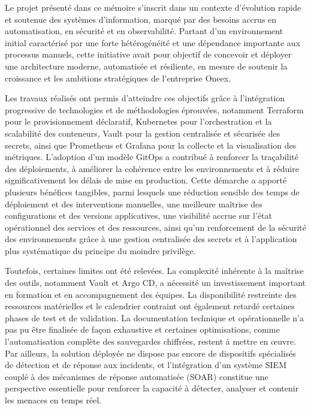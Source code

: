 \thispagestyle{mainmatter}

Le projet présenté dans ce mémoire s’inscrit dans un contexte d’évolution rapide et soutenue des systèmes d’information, marqué par des besoins accrus en automatisation, en sécurité et en observabilité. Partant d’un environnement initial caractérisé par une forte hétérogénéité et une dépendance importante aux processus manuels, cette initiative avait pour objectif de concevoir et déployer une architecture moderne, automatisée et résiliente, en mesure de soutenir la croissance et les ambitions stratégiques de l’entreprise Oneex.

Les travaux réalisés ont permis d’atteindre ces objectifs grâce à l’intégration progressive de technologies et de méthodologies éprouvées, notamment Terraform pour le provisionnement déclaratif, Kubernetes pour l’orchestration et la scalabilité des conteneurs, Vault pour la gestion centralisée et sécurisée des secrets, ainsi que Prometheus et Grafana pour la collecte et la visualisation des métriques. L’adoption d’un modèle GitOps a contribué à renforcer la traçabilité des déploiements, à améliorer la cohérence entre les environnements et à réduire significativement les délais de mise en production. Cette démarche a apporté plusieurs bénéfices tangibles, parmi lesquels une réduction sensible des temps de déploiement et des interventions manuelles, une meilleure maîtrise des configurations et des versions applicatives, une visibilité accrue sur l’état opérationnel des services et des ressources, ainsi qu’un renforcement de la sécurité des environnements grâce à une gestion centralisée des secrets et à l’application plus systématique du principe du moindre privilège.

Toutefois, certaines limites ont été relevées. La complexité inhérente à la maîtrise des outils, notamment Vault et Argo CD, a nécessité un investissement important en formation et en accompagnement des équipes. La disponibilité restreinte des ressources matérielles et le calendrier contraint ont également retardé certaines phases de test et de validation. La documentation technique et opérationnelle n’a pas pu être finalisée de façon exhaustive et certaines optimisations, comme l’automatisation complète des sauvegardes chiffrées, restent à mettre en œuvre. Par ailleurs, la solution déployée ne dispose pas encore de dispositifs spécialisés de détection et de réponse aux incidents, et l’intégration d’un système SIEM couplé à des mécanismes de réponse automatisée (SOAR) constitue une perspective essentielle pour renforcer la capacité à détecter, analyser et contenir les menaces en temps réel.

